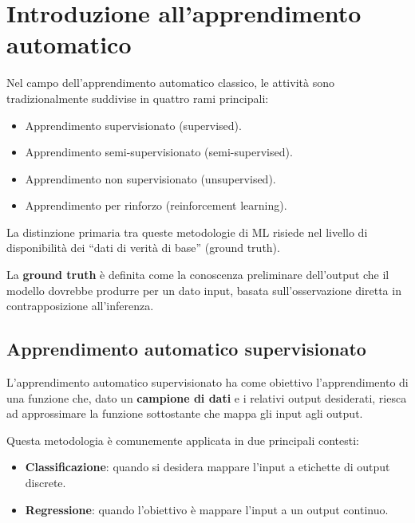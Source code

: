 
\chapter{Introduzione all'apprendimento automatico}

Nel campo dell'apprendimento automatico classico, le attività sono
tradizionalmente suddivise in quattro rami principali:
\begin{itemize}
    \item Apprendimento supervisionato (supervised).
    \item Apprendimento semi-supervisionato (semi-supervised).
    \item Apprendimento non supervisionato (unsupervised).
    \item Apprendimento per rinforzo (reinforcement learning).
\end{itemize}

La distinzione primaria tra queste metodologie di ML risiede nel
livello di disponibilità dei ``dati di verità di base'' (ground truth).

La \textbf{ground truth} è definita come la conoscenza preliminare dell'output
che il modello dovrebbe produrre per un dato input, basata sull'osservazione
diretta in contrapposizione all'inferenza.

\section{Apprendimento automatico supervisionato}

L'apprendimento automatico supervisionato ha come obiettivo l'apprendimento di
una funzione che, dato un \textbf{campione di dati} e i relativi output desiderati,
riesca ad approssimare la funzione sottostante che mappa gli input agli output.

Questa metodologia è comunemente applicata in due principali contesti:
\begin{itemize}
    \item \textbf{Classificazione}: quando si desidera mappare l'input a
    etichette di output discrete.
    \item \textbf{Regressione}: quando l'obiettivo è mappare l'input a un
    output continuo.
\end{itemize}

